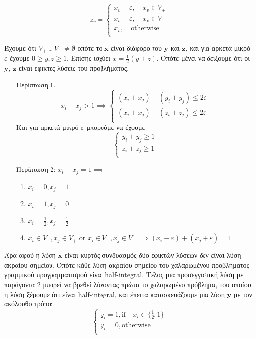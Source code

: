 $$z_v = \begin{cases}
x_v - \varepsilon, \quad x_v \in V_{+}\\
x_v + \varepsilon, \quad x_v \in V_{-}\\
x_v , \quad \text{otherwise}\\
\end{cases}$$

Έχουμε ότι $V_{+}\cup V_{-} \neq \emptyset$ οπότε το $\boldsymbol{x}$ είναι διάφορο του $\boldsymbol{y}$ και $\boldsymbol{z}$, και για αρκετά μικρό $\varepsilon$
έχουμε $0 \geq y, z \geq 1$. Επίσης ισχύει $x = \frac{1}{2} (y + z)$.
Οπότε μένει να δείξουμε ότι οι $\boldsymbol{y}$, $\boldsymbol{z}$ είναι εφικτές λύσεις του προβλήματος.
\begin{enumerate}
\item[Περίπτωση 1:]
$$x_i + x_j > 1 \implies 
\begin{cases}
(x_i + x_j) - (y_i + y_j) \leq 2\varepsilon\\
(x_i + x_j) - (z_i + z_j) \leq 2\varepsilon\\
\end{cases}
$$
{\centering Και για αρκετά μικρό $\varepsilon$ μπορούμε να έχουμε}
$$ 
\begin{cases}
y_i + y_j \geq 1\\
z_i + z_j \geq 1\\
\end{cases}
$$
\item[Περίπτωση 2:]
$x_i + x_j = 1 \implies$
\begin{enumerate}
\item $x_i = 0,  x_j = 1$
\item $x_i = 1,  x_j = 0$
\item $x_i = \frac{1}{2},  x_j = \frac{1}{2}$
\item $x_i \in V_{-}, x_j \in V_{+}$ or $ x_i \in V_{+}, x_j \in V_{-} \implies (x_i - \varepsilon) + (x_j + \varepsilon) = 1$

\end{enumerate}
\end{enumerate}

Άρα αφού η λύση $\boldsymbol{x}$ είναι κυρτός συνδυασμός δύο εφικτών λύσεων δεν είναι λύση ακραίου σημείου. Οπότε κάθε λύση ακραίου σημείου του χαλαρωμένου προβλήματος γραμμικού προγραμματισμού είναι half-integral.
Τέλος μια προσεγγιστική λύση με παράγοντα 2 μπορεί να βρεθεί λύνοντας πρώτα το χαλαρωμένο πρόβλημα, του οποίου η λύση ξέρουμε ότι είναι half-integral, και έπειτα κατασκευάζουμε μια λύση $\boldsymbol{y}$ με τον ακόλουθο τρόπο:
$$
\begin{cases}
y_i = 1, \text{if} \quad x_i \in{\{\frac{1}{2}, 1\}}\\
y_i = 0, \text{otherwise}\\
\end{cases}
$$



